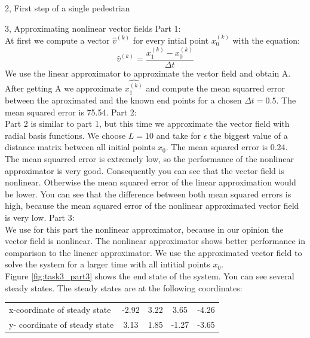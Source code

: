 \documentclass[10pt,a4paper]{article}
\begin{document}
\begin{task}{2, First step of a single pedestrian}
\end{task}

\begin{task}{3, Approximating nonlinear vector fields}
Part 1: \\
At first we compute a vector $\hat{v}^{(k)}$ for every intial point $x_0^{(k)}$ with the equation:
\begin{equation*}
\hat{v}^{(k)} = \frac{x_1^{(k)} -x_0^{(k)}}{\Delta t}
\end{equation*}
We use the linear approximator to approximate the vector field and obtain A. After getting A we approximate $\hat{x_1^{(k)}}$ and compute the mean squarred error between the aproximated and the known end points for a chosen $\Delta t = 0.5$.
The mean squared error is 75.54.\bigbreak
Part 2: \\
Part 2 is similar to part 1, but this time we approximate the vector field with radial basis functions. We choose $L=10$ and take  for $\epsilon$ the biggest value of a distance matrix between all initial points $x_0$.
The mean squared error is 0.24. \\
The mean squarred error is extremely low, so the performance of the nonlinear approximator is very good. Consequently you can see that the vector field is nonlinear. Otherwise the mean squared error of the linear approximation would be lower.
You can see that the difference between both mean squared errors is high, because the mean squared error of the nonlinear approximated vector field is very low. \bigbreak
Part 3: \\
We use for this part the nonlinear approximator, because in our opinion the vector field is nonlinear. The nonlinear approximator shows better performance in comparison to the lineaer approximator. We use the approximated vector field to solve  the system for a larger time with all intitial points $x_0$.\\
Figure \ref{fig:task3_part3} shows the end state of the system. You can see several steady states. The steady states are at the following coordinates: \bigbreak
\begin{tabular}{|l|c|c|c|c|}
\hline
x-coordinate of steady state& -2.92&3.22&3.65&-4.26\\
y- coordinate of steady state& 3.13&1.85&-1.27&-3.65\\
\hline
\end{tabular}
\begin{figure}[H]
\centering

\end{figure}
\end{task}
\end{document}
